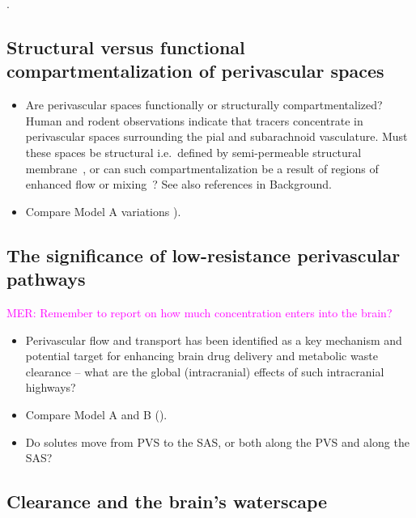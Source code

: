 \documentclass[fleqn,10pt]{wlscirep}
\newcommand{\mer}[1]{\textcolor{magenta}{#1}}
\newcommand{\draft}[1]{\textcolor{gray}{#1}}
\begin{document}
.

\subsection*{Structural versus functional compartmentalization of perivascular spaces}

\begin{itemize}
\item
  Are perivascular spaces functionally or structurally
  compartmentalized? Human and rodent observations indicate that
  tracers concentrate in perivascular spaces surrounding the pial and
  subarachnoid vasculature. Must these spaces be structural
  i.e.~defined by semi-permeable structural
  membrane~\cite{zhang1990interrelationships, zhang1992directional,
    mestre2018flow, eide2024functional}, or can such
  compartmentalization be a result of regions of enhanced flow or
  mixing~\cite{bedussi2017paravascular, vinje2021brain}? See also
  references in Background.
\item
  Compare Model A variations ).
\end{itemize}

\draft{\lipsum[1]}

\subsection*{The significance of low-resistance perivascular pathways}

\mer{MER: Remember to report on how much concentration enters into the brain?}

\begin{itemize}
\item
  Perivascular flow and transport has been identified as a key
  mechanism and potential target for enhancing brain drug delivery and
  metabolic waste clearance -- what are the global (intracranial)
  effects of such intracranial highways? 
\item
  Compare Model A and B ().
\item
  Do solutes move from PVS to the SAS, or both along the PVS and along the SAS?
\end{itemize}

\draft{\lipsum[1]}

\subsection*{Clearance and the brain's waterscape}
\end{document}
